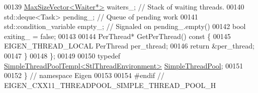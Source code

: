 \begin{DoxyCode}
00139   \hyperlink{class_eigen_1_1_max_size_vector}{MaxSizeVector<Waiter*>} waiters\_;  \textcolor{comment}{// Stack of waiting threads.}
00140   std::deque<Task> pending\_;        \textcolor{comment}{// Queue of pending work}
00141   std::condition\_variable empty\_;   \textcolor{comment}{// Signaled on pending\_.empty()}
00142   \textcolor{keywordtype}{bool} exiting\_ = \textcolor{keyword}{false};
00143 
00144   PerThread* GetPerThread()\textcolor{keyword}{ const }\{
00145     EIGEN\_THREAD\_LOCAL PerThread per\_thread;
00146     \textcolor{keywordflow}{return} &per\_thread;
00147   \}
00148 \};
00149 
00150 \textcolor{keyword}{typedef} \hyperlink{class_eigen_1_1_simple_thread_pool_templ}{SimpleThreadPoolTempl<StlThreadEnvironment>} 
      \hyperlink{class_eigen_1_1_simple_thread_pool_templ}{SimpleThreadPool};
00151 
00152 \}  \textcolor{comment}{// namespace Eigen}
00153 
00154 \textcolor{preprocessor}{#endif  // EIGEN\_CXX11\_THREADPOOL\_SIMPLE\_THREAD\_POOL\_H}
\end{DoxyCode}
